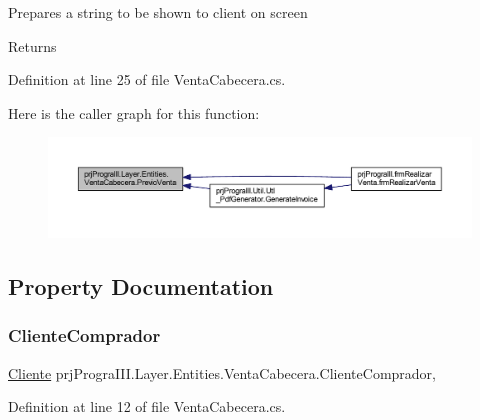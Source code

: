 Prepares a string to be shown to client on screen 

\begin{DoxyReturn}{Returns}

\end{DoxyReturn}


Definition at line 25 of file Venta\+Cabecera.\+cs.

Here is the caller graph for this function\+:
\nopagebreak
\begin{figure}[H]
\begin{center}
\leavevmode
\includegraphics[width=350pt]{classprj_progra_i_i_i_1_1_layer_1_1_entities_1_1_venta_cabecera_a74d25a78b7a948f486fc6c850cea3b43_icgraph}
\end{center}
\end{figure}


\subsection{Property Documentation}
\hypertarget{classprj_progra_i_i_i_1_1_layer_1_1_entities_1_1_venta_cabecera_a0ff8602ca349f48214db9d53515fb188}{}\label{classprj_progra_i_i_i_1_1_layer_1_1_entities_1_1_venta_cabecera_a0ff8602ca349f48214db9d53515fb188} 
\subsubsection{\texorpdfstring{Cliente\+Comprador}{ClienteComprador}}
{\footnotesize\ttfamily \hyperlink{classprj_progra_i_i_i_1_1_layer_1_1_entities_1_1_cliente}{Cliente} prj\+Progra\+I\+I\+I.\+Layer.\+Entities.\+Venta\+Cabecera.\+Cliente\+Comprador\hspace{0.3cm}{\ttfamily [get]}, {\ttfamily [set]}}



Definition at line 12 of file Venta\+Cabecera.\+cs.

